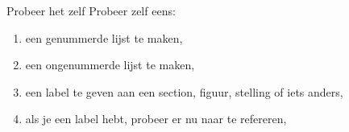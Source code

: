 
\begin{frame}{Probeer het zelf}
	Probeer zelf eens: 
	\begin{enumerate}[label=\roman*.]
		\item een genummerde lijst te maken,
		\item een ongenummerde lijst te maken,
		\item een label te geven aan een section, figuur, stelling of iets anders,
		\item als je een label hebt, probeer er nu naar te refereren,
	\end{enumerate}
\end{frame}